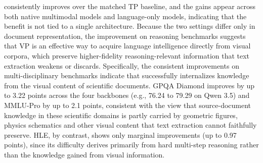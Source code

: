 \methodname consistently improves over the matched TP baseline, and the gains appear across
both native multimodal models and language-only models, indicating that the benefit is not tied to a single architecture. 
Because the two settings differ only in document representation, the improvement on reasoning benchmarks
suggests that VP is an effective way to acquire language intelligence directly from visual corpora, which
preserve higher-fidelity reasoning-relevant information that text extraction weakens or discards.
Specifically, the consistent improvements on multi-disciplinary benchmarks indicate that \methodname
successfully internalizes knowledge from the visual content of scientific documents. 
GPQA Diamond improves by up to 3.22 points across the four backbones (e.g., 76.24 to 79.29 on Qwen 3.5) and MMLU-Pro by up to 2.1 points, 
consistent with the view that source-document knowledge in these scientific domains is partly carried by geometric
figures, physics schematics and other visual content that text extraction cannot faithfully preserve.
HLE, by contrast, shows only marginal improvements (up to 0.97 points), 
since its difficulty derives primarily from hard multi-step reasoning
rather than the knowledge gained from visual information. 




